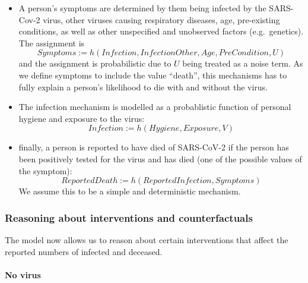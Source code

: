 \documentclass[
]{book}
\theoremstyle{definition}
\theoremstyle{definition}
\theoremstyle{definition}
\theoremstyle{remark}
\begin{document}
\begin{itemize}
\item
  A person's symptoms are determined by them being infected by the SARS-Cov-2 virus, other viruses causing respiratory diseases, age, pre-existing conditions, as well as other unspecified and unobserved factors (e.g.~genetics). The assignment is
  \begin{equation}
  Symptoms := h(Infection, InfectionOther, Age, PreCondition, U)
  \end{equation}
  and the assignment is probabilistic due to \(U\) being treated as a noise term. As we define symptoms to include the value ``death'', this mechanisms has to fully explain a person's likelihood to die with and without the virus.
\item
  The infection mechanism is modelled as a probablistic function of personal hygiene and exposure to the virus:
  \begin{equation}
  Infection := h(Hygiene, Exposure, V)
  \end{equation}
\item
  finally, a person is reported to have died of SARS-CoV-2 if the person has been positively tested for the virus and has died (one of the possible values of the symptom):
  \begin{equation}
  ReportedDeath := h(ReportedInfection, Symptoms)
  \end{equation}
  We assume this to be a simple and deterministic mechanism.
\end{itemize}

\hypertarget{reasoning-about-interventions-and-counterfactuals}{%
\subsubsection{Reasoning about interventions and counterfactuals}\label{reasoning-about-interventions-and-counterfactuals}}

The model now allows us to reason about certain interventions that affect the reported numbers of infected and deceased.

\hypertarget{no-virus}{%
\paragraph{No virus}\label{no-virus}}
\end{document}
